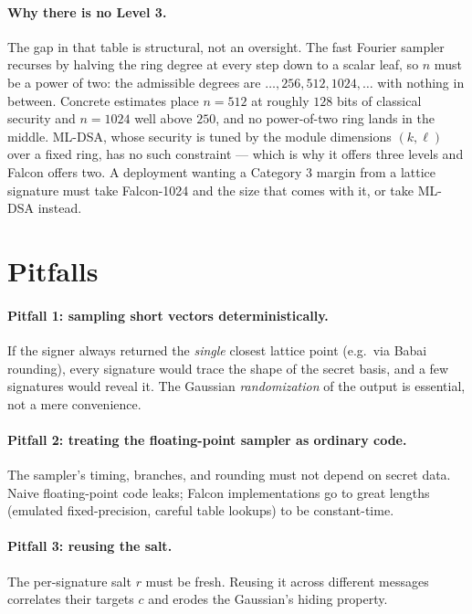 \paragraph{Why there is no Level 3.}
The gap in that table is structural, not an oversight. The fast Fourier sampler
recurses by halving the ring degree at every step down to a scalar leaf, so $n$
must be a power of two: the admissible degrees are $\dots, 256, 512, 1024,
\dots$ with nothing in between. Concrete estimates place $n=512$ at roughly $128$
bits of classical security and $n=1024$ well above $250$, and no power-of-two
ring lands in the middle. ML-DSA, whose security is tuned by the module
dimensions $(k,\ell)$ over a fixed ring, has no such constraint --- which is why
it offers three levels and Falcon offers two. A deployment wanting a Category 3
margin from a lattice signature must take Falcon-1024 and the size that comes
with it, or take ML-DSA instead.

\section{Pitfalls}

\paragraph{Pitfall 1: sampling short vectors deterministically.}
If the signer always returned the \emph{single} closest lattice point (e.g.\ via Babai rounding), every signature would trace the shape of the secret basis, and a few signatures would reveal it. The Gaussian \emph{randomization} of the output is essential, not a mere convenience.

\paragraph{Pitfall 2: treating the floating-point sampler as ordinary code.}
The sampler's timing, branches, and rounding must not depend on secret data. Naive floating-point code leaks; Falcon implementations go to great lengths (emulated fixed-precision, careful table lookups) to be constant-time.

\paragraph{Pitfall 3: reusing the salt.}
The per-signature salt $r$ must be fresh. Reusing it across different messages correlates their targets $c$ and erodes the Gaussian's hiding property.

